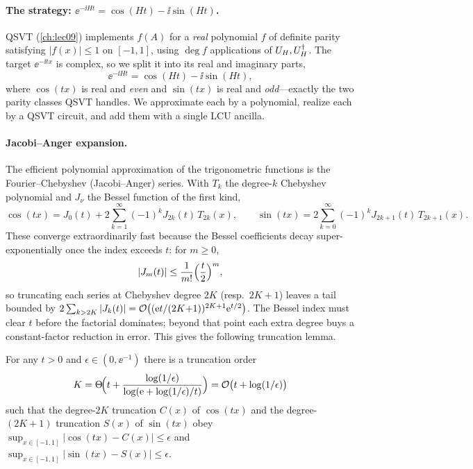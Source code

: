 \paragraph{The strategy: \texorpdfstring{$\ee^{-\ii Ht}=\cos(Ht)-\ii\sin(Ht)$}{e=cos-i sin}.}
QSVT (\cref{ch:lec09}) implements $f(A)$ for a \emph{real} polynomial $f$ of definite
parity satisfying $|f(x)|\le1$ on $[-1,1]$, using $\deg f$ applications of $U_H,U_H^{\dagger}$.
The target $\ee^{-\ii tx}$ is complex, so we split it into its real and imaginary parts,
\begin{equation}
  \ee^{-\ii Ht}=\cos(Ht)-\ii\sin(Ht),
  \label{eq:lec12-cossin}
\end{equation}
where $\cos(tx)$ is real and \emph{even} and $\sin(tx)$ is real and \emph{odd}---exactly the
two parity classes QSVT handles. We approximate each by a polynomial, realize each by a
QSVT circuit, and add them with a single LCU ancilla.

\paragraph{Jacobi--Anger expansion.}
The efficient polynomial approximation of the trigonometric functions is the
Fourier--Chebyshev (Jacobi--Anger) series. With $T_k$ the degree-$k$ Chebyshev polynomial
and $J_\nu$ the Bessel function of the first kind,
\begin{equation}
  \cos(tx)=J_0(t)+2\sum_{k=1}^{\infty}(-1)^kJ_{2k}(t)\,T_{2k}(x),
  \qquad
  \sin(tx)=2\sum_{k=0}^{\infty}(-1)^kJ_{2k+1}(t)\,T_{2k+1}(x).
  \label{eq:lec12-jacobi-anger}
\end{equation}
These converge extraordinarily fast because the Bessel coefficients decay
super-exponentially once the index exceeds $t$: for $m\ge0$,
\begin{equation}
  |J_m(t)|\le\frac{1}{m!}\Bigl(\frac{t}{2}\Bigr)^m,
  \label{eq:lec12-bessel-tail}
\end{equation}
so truncating each series at Chebyshev degree $2K$ (resp.\ $2K+1$) leaves a tail bounded by
$2\sum_{k>2K}|J_k(t)|=\mathcal{O}\bigl((\mathrm{e} t/(2K{+}1))^{2K+1}\mathrm{e}^{t/2}\bigr)$. The Bessel index
must clear $t$ before the factorial dominates; beyond that point each extra degree buys a
constant-factor reduction in error. This gives the following truncation lemma.

\begin{lemma}
\label{lem:lec12-ja-degree}
For any $t>0$ and $\epsilon\in(0,\ee^{-1})$ there is a truncation order
\begin{equation}
  K=\Theta\!\Bigl(t+\frac{\log(1/\epsilon)}{\log(\mathrm{e}+\log(1/\epsilon)/t)}\Bigr)
   =\mathcal{O}\bigl(t+\log(1/\epsilon)\bigr)
  \label{eq:lec12-ja-K}
\end{equation}
such that the degree-$2K$ truncation $C(x)$ of $\cos(tx)$ and the degree-$(2K{+}1)$
truncation $S(x)$ of $\sin(tx)$ obey
$\sup_{x\in[-1,1]}|\cos(tx)-C(x)|\le\epsilon$ and
$\sup_{x\in[-1,1]}|\sin(tx)-S(x)|\le\epsilon$.
\end{lemma}

